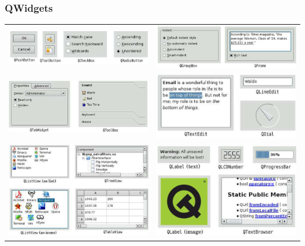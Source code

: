 \subsubsection{QWidgets}
\begin{tabular}{c c}
	\includegraphics[width=9cm]{images/button_1.png}&
    \includegraphics[width=9cm]{images/button_2.png}\\
	\includegraphics[width=9cm]{images/button_3.png}&
    \includegraphics[width=9cm]{images/button_7.png}\\
	\includegraphics[width=9cm]{images/button_4.png}&
	\includegraphics[width=9cm]{images/button_5.png}\\

\end{tabular}
